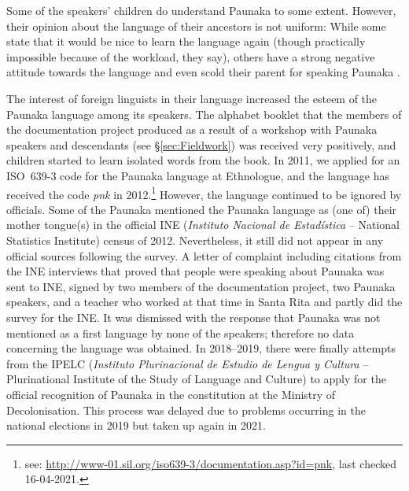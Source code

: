 %
%
Some of the speakers’ children do understand Paunaka to some extent. However, their opinion about the language of their ancestors is not uniform: While some state that it would be nice to learn the language again (though practically impossible because of the workload, they say), others have a strong negative attitude towards the language and even scold their parent for speaking Paunaka \citep[10, 12-13]{Villalta2013}.

The interest of foreign linguists in their language increased the esteem of the Paunaka language among its speakers. The alphabet booklet that the members of the documentation project produced as a result of a workshop with Paunaka speakers and descendants (see §\ref{sec:Fieldwork}) was received very positively, and children started to learn isolated words from the book. 
In 2011, we applied for an ISO~639-3 code for the Paunaka language at Ethnologue, and the language has received the code \textit{pnk} in 2012.\footnote{see: \url{http://www-01.sil.org/iso639-3/documentation.asp?id=pnk}, last checked 16-04-2021.} However, the language continued to be ignored by officials. Some of the Paunaka mentioned the Paunaka language as (one of) their mother tongue(s) in the official INE (\textit{Instituto Nacional de Estadística} – National Statistics Institute) census of 2012. Nevertheless, it still did not appear in any official sources following the survey. A letter of complaint including citations from the INE interviews that proved that people were speaking about Paunaka was sent to INE, signed by two members of the documentation project, two Paunaka speakers, and a teacher who worked at that time in Santa Rita and partly did the survey for the INE. It was dismissed with the response that Paunaka was not mentioned as a first language by none of the speakers; therefore no data concerning the language was obtained.
In 2018–2019, there were finally attempts from the IPELC (\textit{Instituto Plurinacional de Estudio de Lengua y Cultura} – Plurinational Institute of the Study of Language and Culture) to apply for the official recognition of Paunaka in the constitution at the Ministry of Decolonisation. This process was delayed due to problems occurring in the national elections in 2019 but taken up again in 2021.

